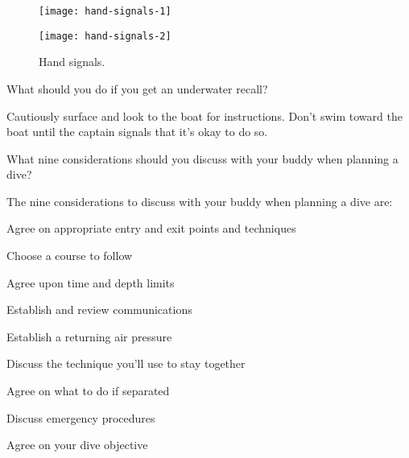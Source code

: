 	\begin{figure}
		\centering
		\begin{minipage}{0.48\textwidth}
			\raggedleft \texttt{[image: hand-signals-1]}
		\end{minipage}
		\hfill
		\begin{minipage}{0.48\textwidth}
			\raggedright \texttt{[image: hand-signals-2]}
		\end{minipage}

		\caption{Hand signals.}
		\label{fig:handsignals}
	\end{figure}

	\begin{qanda}
		\begin{question}
What should you do if you get an underwater recall?
		\end{question}

		\begin{answer}
Cautiously surface and look to the boat for instructions.  Don't swim toward the boat until the captain signals that it's okay to do so.
		\end{answer}
	\end{qanda}

	\begin{qanda}
		\begin{question}
What nine considerations should you discuss with your buddy when planning a dive?
		\end{question}

		\begin{answer}
The nine considerations to discuss with your buddy when planning a dive are:
			\begin{nospacenumberedlist}
				\item Agree on appropriate entry and exit points and techniques
				\item Choose a course to follow
				\item Agree upon time and depth limits
				\item Establish and review communications
				\item Establish a returning air pressure
				\item Discuss the technique you'll use to stay together
				\item Agree on what to do if separated
				\item Discuss emergency procedures
				\item Agree on your dive objective
			\end{nospacenumberedlist}
		\end{answer}
	\end{qanda}

